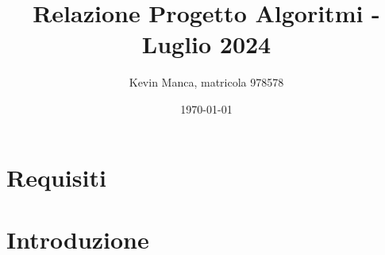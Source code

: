 \documentclass[13pt]{article}
\author{Kevin Manca, matricola 978578}
\date{\today}
\title{Relazione Progetto Algoritmi - Luglio 2024}
\begin{document}
\maketitle
\tableofcontents

\section{Requisiti}

\section{Introduzione}

\subsection{}
  
\end{document}
